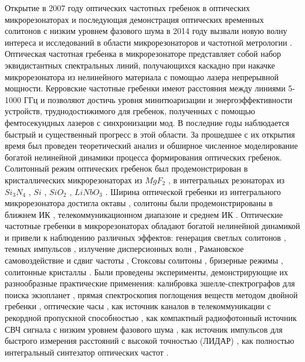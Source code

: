 
{\actuality} Открытие в 2007 году оптических частотных гребенок в оптических микрорезонаторах \cite{DelHaye2007} и последующая демонстрация оптических временных солитонов \cite{Herr2014} с низким уровнем фазового шума в 2014 году вызвали новую волну интереса и исследований в области микрорезонаторов и частотной метрологии \cite{Kippenberg2011,Kippenbergeaan8083}. Оптическая частотная гребенка в микрорезонаторе представляет собой набор эквидистантных спектральных линий, получающихся каскадно при накачке микрорезонатора из нелинейного материала с помощью лазера непрерывной мощности. Керровские частотные гребенки имеют расстояния между линиями 5-1000 ГГц и позволяют достичь уровня минитюаризации и энергоэффективности устройств, труднодостижимого для гребенок, полученных с помощью фемтосекундных лазеров с синхронизации мод. В последние годы наблюдается быстрый и существенный прогресс в этой области. За прошедшее с их открытия время был проведен теоретический анализ и обширное численное моделирование богатой нелинейной динамики процесса формирования оптических гребенок. Солитонный режим оптических гребенок был продемонстрирован в кристаллических микрорезонаторах из $MgF_2$ \cite{Herr2014}, в интегральных резонаторах из $Si_3N_4$ \cite{Brasch2016}, $Si$ \cite{Yu2016}, $SiO_2$ \cite{Yi2015}, $LiNbO_3$ \cite{2018arXiv181209610H}. Ширина оптической гребенки из интегрального микрорезонатора достигла октавы \cite{Pfeiffer:17}, солитоны были продемонстрированы в ближнем ИК \cite{Karpov2018}, телекоммуникационном диапазоне \cite{Herr2014} и среднем ИК \cite{Griffith2016}. Оптические частотные гребенки в микрорезонаторах обладают богатой нелинейной динамикой и привели к наблюдению различных эффектов: генерация светлых солитонов \cite{Herr2014}, темных импульсов \cite{Xue2015}, излучение дисперсионных волн \cite{Brasch2016}, Рамановское самовоздействие и сдвиг частоты \cite{Karpov2016}, Стоксовы солитоны \cite{Yang2016stokes}, бризерные режимы \cite{Lucas2017breather}, солитонные кристаллы \cite{Cole2017crystals}. Были проведены эксперименты, демонстрирующие их разнообразные практические применения: калибровка эшелле-спектрографов для поиска экзопланет \cite{Obrzud2019}, прямая спектроскопия поглощения веществ методом двойной гребенки \cite{Suh2016}, оптические часы \cite{Papp2014}, как источник каналов в телекоммуникации с рекордной пропускной способностью \cite{MarinPalomo2017}, как компактный радиофотонный источник СВЧ сигнала с низким уровнем фазового шума \cite{Liang2015}, как источник импульсов для быстрого измерения расстояний с высокой точностью (ЛИДАР) \cite{Trocha887}, как полностью интегральный синтезатор оптических частот \cite{Spencer2018}.

